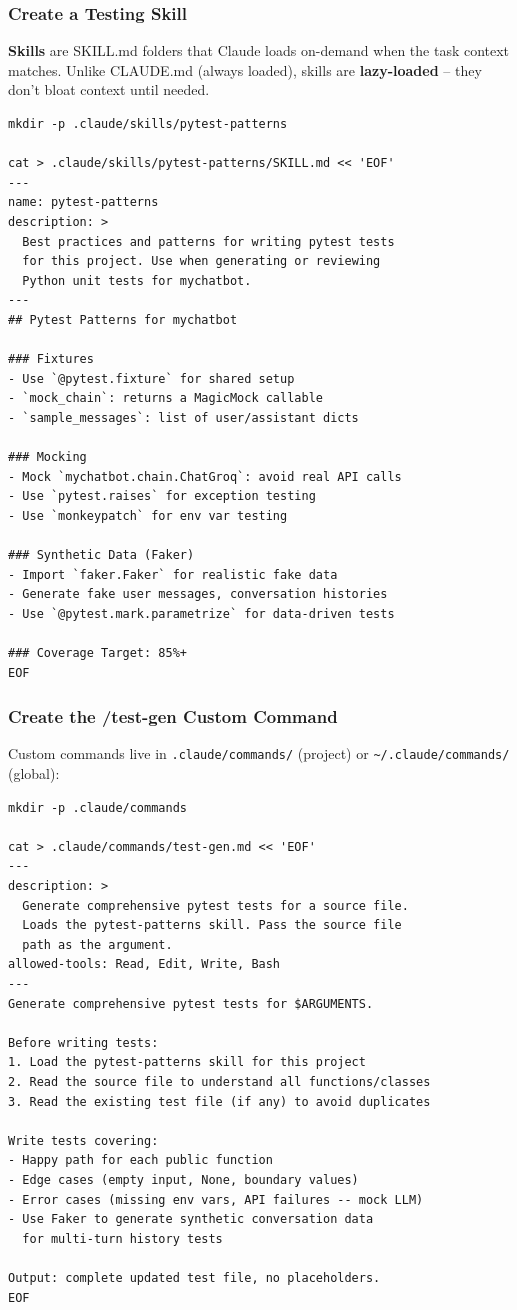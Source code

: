 \begin{frame}[fragile]\frametitle{Create a Testing Skill}
\textbf{Skills} are SKILL.md folders that Claude loads on-demand when the task context matches. Unlike CLAUDE.md (always loaded), skills are \textbf{lazy-loaded} -- they don't bloat context until needed.

\begin{lstlisting}
mkdir -p .claude/skills/pytest-patterns

cat > .claude/skills/pytest-patterns/SKILL.md << 'EOF'
---
name: pytest-patterns
description: >
  Best practices and patterns for writing pytest tests
  for this project. Use when generating or reviewing
  Python unit tests for mychatbot.
---
## Pytest Patterns for mychatbot

### Fixtures
- Use `@pytest.fixture` for shared setup
- `mock_chain`: returns a MagicMock callable
- `sample_messages`: list of user/assistant dicts

### Mocking
- Mock `mychatbot.chain.ChatGroq`: avoid real API calls
- Use `pytest.raises` for exception testing
- Use `monkeypatch` for env var testing

### Synthetic Data (Faker)
- Import `faker.Faker` for realistic fake data
- Generate fake user messages, conversation histories
- Use `@pytest.mark.parametrize` for data-driven tests

### Coverage Target: 85%+
EOF
\end{lstlisting}
\end{frame}


\begin{frame}[fragile]\frametitle{Create the /test-gen Custom Command}
Custom commands live in \texttt{.claude/commands/} (project) or \texttt{\~{}/.claude/commands/} (global):

\begin{lstlisting}
mkdir -p .claude/commands

cat > .claude/commands/test-gen.md << 'EOF'
---
description: >
  Generate comprehensive pytest tests for a source file.
  Loads the pytest-patterns skill. Pass the source file
  path as the argument.
allowed-tools: Read, Edit, Write, Bash
---
Generate comprehensive pytest tests for $ARGUMENTS.

Before writing tests:
1. Load the pytest-patterns skill for this project
2. Read the source file to understand all functions/classes
3. Read the existing test file (if any) to avoid duplicates

Write tests covering:
- Happy path for each public function
- Edge cases (empty input, None, boundary values)
- Error cases (missing env vars, API failures -- mock LLM)
- Use Faker to generate synthetic conversation data
  for multi-turn history tests

Output: complete updated test file, no placeholders.
EOF
\end{lstlisting}
\end{frame}


